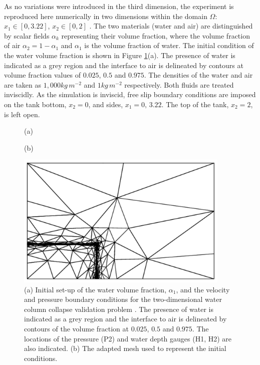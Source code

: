 As no variations were introduced in the third dimension, the experiment is reproduced here numerically in two dimensions within the domain $\Omega$: $x_1 \in [0,3.22]$, $x_2 \in [0,2]$ \citep{lee_numerical_2002, colagrossi_numerical_2003, park_volume-of-fluid_2009}.  The two materials (water and air) are distinguished by scalar fields $\alpha_k$ representing their volume fraction, where the volume fraction of air $\alpha_2 = 1-\alpha_1$ and $\alpha_1$ is the volume fraction of water. The initial condition of the water volume fraction is shown in Figure \ref{fig:zhouinitial}(a).  The presence of water is indicated as a grey region and the interface to air is delineated by contours at volume fraction values of $0.025$, $0.5$ and $0.975$.  The densities of the water and air are taken as $ 1,000kg\,m^{-2}$ and $1kg\,m^{-2}$ respectively.  Both fluids are treated inviscidly. As the simulation is inviscid, free slip boundary conditions are imposed on the tank bottom, $x_2=0$, and sides, $x_1=0,\,3.22$.  The top of the tank, $x_2=2$, is left open.

\begin{figure}[tbp]
\hspace{1cm}(a)
\begin{center}

\end{center}
\hspace{1cm}(b)
\begin{center}
\includegraphics[width=10.2cm, trim=2.5cm 4.5cm 2.5cm 4.5cm, clip=true]{examples_images/water_collapse/water_collapse_0_mesh.pdf}
\end{center}
\caption{(a) Initial set-up of the water volume fraction, $\alpha_1$, and the velocity and pressure boundary conditions for the two-dimensional water column collapse validation problem \citep{zhou_nonlinear_1999}. The presence of water is indicated as a grey region and the interface to air is delineated by contours of the volume fraction at $0.025$, $0.5$ and $0.975$.  The locations of the pressure (P2) and water depth gauges (H1, H2) are also indicated. (b) The adapted mesh used to represent the initial conditions.}
\label{fig:zhouinitial}
\end{figure}

